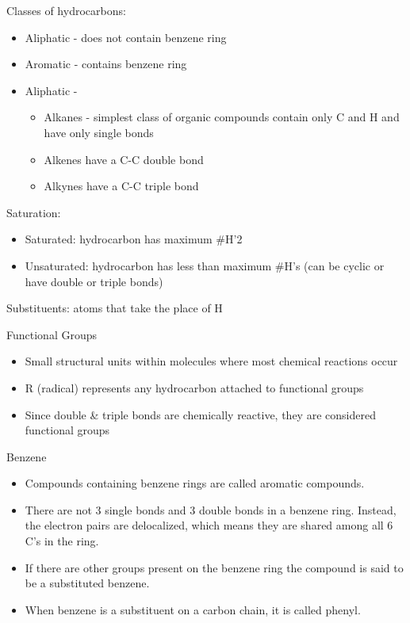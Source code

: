 \documentclass[../hchem.tex]{subfiles}
\begin{document}
Classes of hydrocarbons:
\begin{itemize}
    \item Aliphatic - does not contain benzene ring 
    \item Aromatic - contains benzene ring 
    \item Aliphatic -
    \begin{itemize}
        \item Alkanes - simplest class of organic compounds contain only C and H and have only single bonds 
        \item Alkenes have a C-C double bond 
        \item Alkynes have a C-C triple bond 
    \end{itemize}
\end{itemize}

Saturation:
\begin{itemize}
    \item Saturated: hydrocarbon has maximum \#H'2 
    \item Unsaturated: hydrocarbon has less than maximum \#H's (can be cyclic or have double or triple bonds)
\end{itemize}

Substituents: atoms that take the place of H 

Functional Groups 
\begin{itemize}
    \item Small structural units within molecules where most chemical reactions occur 
    \item R (radical) represents any hydrocarbon attached to functional groups 
    \item Since double \& triple bonds are chemically reactive, they are considered functional groups 
\end{itemize}

Benzene 
\begin{itemize}
    \item Compounds containing benzene rings are called aromatic compounds.
    \item There are not 3 single bonds and 3 double bonds in a benzene ring. Instead, the electron pairs are delocalized, which means they are shared among all 6 C's in the ring. 
    \item If there are other groups present on the benzene ring the compound is said to be a substituted benzene.
    \item When benzene is a substituent on a carbon chain, it is called phenyl.
\end{itemize}
\end{document}
